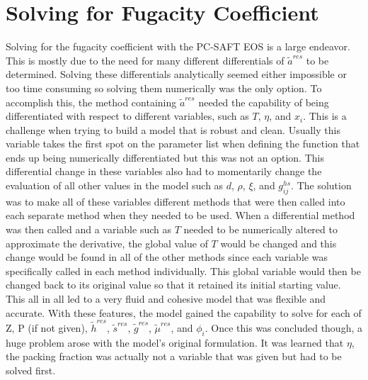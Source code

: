 \documentclass[12pt, letterpaper]{article}
\begin{document}
\section{Solving for Fugacity Coefficient}
Solving for the fugacity coefficient with the PC-SAFT EOS is a large endeavor. This is mostly due to the need for many different differentials of $\tilde{a}^{res}$ to be determined. Solving these differentials analytically seemed either impossible or too time consuming so solving them numerically was the only option. To accomplish this, the method containing $\tilde{a}^{res}$ needed the capability of being differentiated with respect to different variables, such as $T$, $\eta$, and $x_i$. This is a challenge when trying to build a model that is robust and clean. Usually this variable takes the first spot on the parameter list when defining the function that ends up being numerically differentiated but this was not an option. This differential change in these variables also had to momentarily change the evaluation of all other values in the model such as $d$, $\rho$, $\xi$, and $g_{ij}^{hs}$. The solution was to make all of these variables different methods that were then called into each separate method when they needed to be used. When a differential method was then called and a variable such as $T$ needed to be numerically altered to approximate the derivative, the global value of $T$ would be changed and this change would be found in all of the other methods since each variable was specifically called in each method individually. This global variable would then be changed back to its original value so that it retained its initial starting value. This all in all led to a very fluid and cohesive model that was flexible and accurate. With these features, the model gained the capability to solve for each of $\text{Z}$, $\text{P}$ (if not given), $\tilde{h}^{res}$, $\tilde{s}^{res}$, $\tilde{g}^{res}$, $\tilde{\mu}^{res}$, and $\phi _i$. Once this was concluded though, a huge problem arose with the model's original formulation. It was learned that $\eta$, the packing fraction was actually not a variable that was given but had to be solved first.
\end{document}
